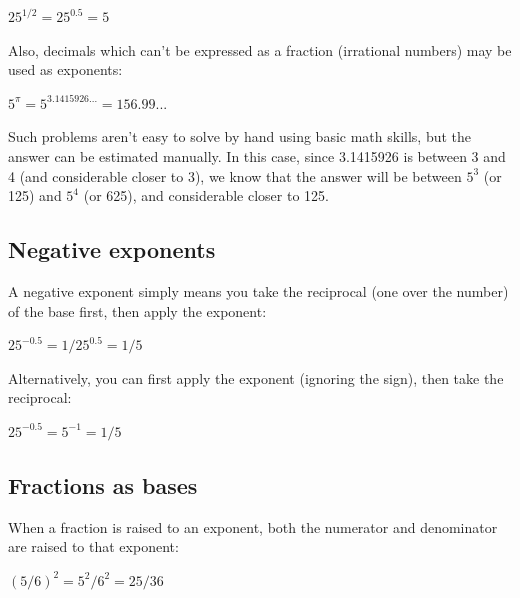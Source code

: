 $25^{1/2} = 25^{0.5} = 5 \;$



Also, decimals which can't be expressed as a fraction (irrational numbers) may be used as exponents:



$5^{\pi} = 5^{3.1415926...} = 156.99...\;$



Such problems aren't easy to solve by hand using basic math skills, but the answer can be
estimated manually. In this case, since 3.1415926 is between 3 and 4 (and considerable
closer to 3), we know that the answer will be between $5^3$ (or 125) and $5^4$ (or 625),
and considerable closer to 125.




\subsection{Negative exponents}
\label{sss:nega-74a9}




A negative exponent simply means you take the reciprocal (one over the number) of the base
first, then apply the exponent:



$25^{-0.5} = 1/25^{0.5} = 1/5 \;$



Alternatively, you can first apply the exponent (ignoring the sign), then take the reciprocal:



$25^{-0.5} = 5^{-1} = 1/5 \;$




\subsection{Fractions as bases}
\label{sss:frac-d08a}




When a fraction is raised to an exponent, both the numerator and denominator are raised to
that exponent:



$(5/6)^2 = 5^2/6^2 = 25/36 \;$



